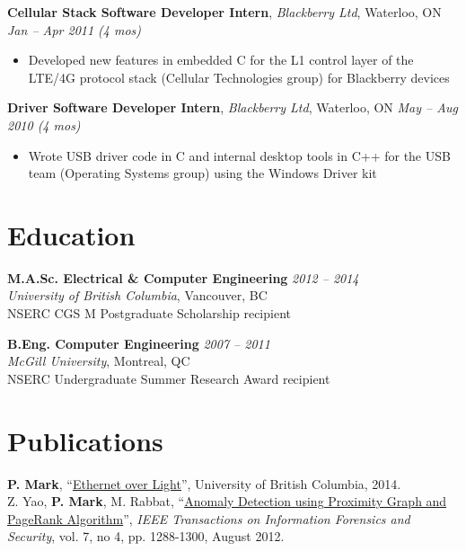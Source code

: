 \documentclass[letterpaper]{article}
\newcommand{\jobtitle}[4]{
  \textbf{#1}, \emph{#2}, {#3} \hfill \emph{#4}\\
}
\newenvironment{jobdescription}{
  \vspace{-4pt}
  \begin{itemize}
  \setlength{\itemsep}{2pt}
  \setlength{\parskip}{0pt}
  \setlength{\parsep}{0pt}
}{\end{itemize}}
\begin{document}
\jobtitle{Cellular Stack Software Developer Intern}{Blackberry
Ltd}{Waterloo, ON}{Jan -- Apr 2011 (4 mos)}
\begin{jobdescription}
  \item Developed new features in embedded C for the L1 control layer of the
  LTE/4G protocol stack (Cellular Technologies group) for Blackberry devices
\end{jobdescription}

\jobtitle{Driver Software Developer Intern}{Blackberry
Ltd}{Waterloo, ON}{May -- Aug 2010 (4 mos)} 
\begin{jobdescription}
  \item Wrote USB driver code in C and internal desktop tools in C++ for the USB
  team (Operating Systems group) using the Windows Driver kit
\end{jobdescription}
\bigskip

\section*{Education}
\textbf{M.A.Sc. Electrical \& Computer Engineering}
\hfill \emph{2012 -- 2014}{} \\
\emph{University of British Columbia}, Vancouver, BC \\
NSERC CGS M Postgraduate Scholarship recipient
\medskip 

\textbf{B.Eng. Computer Engineering} \hfill \emph{2007 -- 2011} \\
\emph{McGill University}, Montreal, QC \\
NSERC Undergraduate Summer Research Award recipient
\bigskip

\hypertarget{sec:publications}{}
\section*{Publications}
\textbf{P. Mark}, ``\href{http://circle.ubc.ca/handle/2429/51772}{Ethernet over
  Light}'', University of British Columbia, 2014. \\
\medskip
Z. Yao, \textbf{P. Mark}, M. Rabbat, 
``\href{http://ieeexplore.ieee.org/xpl/articleDetails.jsp?arnumber=6175122}
{Anomaly Detection using Proximity Graph and PageRank Algorithm}'', \emph{IEEE 
Transactions on Information Forensics and Security}, vol. 7, no 4, pp. 
1288-1300, August 2012.
\bigskip
\end{document}

